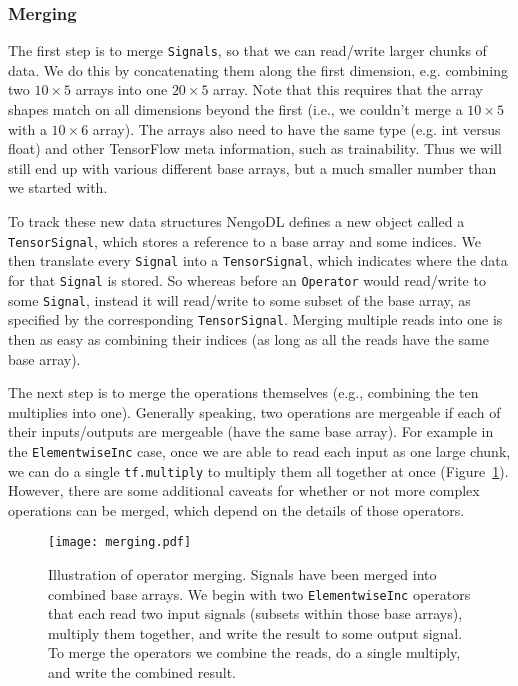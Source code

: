 \documentclass{article}
\begin{document}
\subsubsection{Merging}
\label{sec:merging}

The first step is to merge \texttt{Signals}, so that we can read/write larger chunks of data.  We do this by concatenating them along the first dimension, e.g. combining two $10 \times 5$ arrays into one $20 \times 5$ array.  Note that this requires that the array shapes match on all dimensions beyond the first (i.e., we couldn't merge a $10 \times 5$ with a $10 \times 6$ array).  The arrays also need to have the same type (e.g. int versus float) and other TensorFlow meta information, such as trainability.  Thus we will still end up with various different base arrays, but a much smaller number than we started with.

To track these new data structures NengoDL defines a new object called a \texttt{TensorSignal}, which stores a reference to a base array and some indices.  We then translate every \texttt{Signal} into a \texttt{TensorSignal}, which indicates where the data for that \texttt{Signal} is stored.  So whereas before an \texttt{Operator} would read/write to some \texttt{Signal}, instead it will read/write to some subset of the base array, as specified by the corresponding \texttt{TensorSignal}.  Merging multiple reads into one is then as easy as combining their indices (as long as all the reads have the same base array).

The next step is to merge the operations themselves (e.g., combining the ten multiplies into one).  Generally speaking, two operations are mergeable if each of their inputs/outputs are mergeable (have the same base array).  For example in the \texttt{ElementwiseInc} case, once we are able to read each input as one large chunk, we can do a single \texttt{tf.multiply} to multiply them all together at once (Figure~\ref{fig:merging}).  However, there are some additional caveats for whether or not more complex operations can be merged, which depend on the details of those operators.

\begin{figure}
\centering
\texttt{[image: merging.pdf]}
\caption{Illustration of operator merging.  Signals have been merged into combined base arrays.  We begin with two \texttt{ElementwiseInc} operators that each read two input signals (subsets within those base arrays), multiply them together, and write the result to some output signal.  To merge the operators we combine the reads, do a single multiply, and write the combined result.}
\label{fig:merging}
\end{figure}
\end{document}
